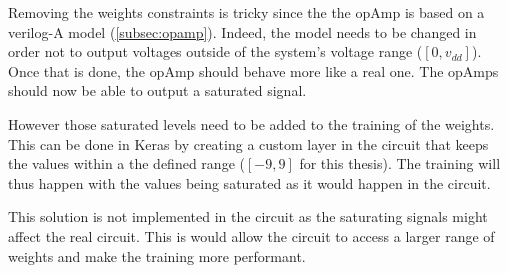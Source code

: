 Removing the weights constraints is tricky since the the \ac{opAmp} is based on a verilog-A model (\cref{subsec:opamp}). Indeed, the model needs to be changed in order not to output voltages outside of the system's voltage range ($[0,v_{dd}]$). Once that is done, the \ac{opAmp} should behave more like a real one. The \acp{opAmp} should now be able to output a saturated signal.

However those saturated levels need to be added to the training of the weights. This can be done in Keras by creating a custom layer in the circuit that keeps the values within a the defined range ($[-9,9]$ for this thesis). The training will thus happen with the values being saturated as it would happen in the circuit.

This solution is not implemented in the circuit as the saturating signals might affect the real circuit. This is would allow the circuit to access a larger range of weights and make the training more performant.
